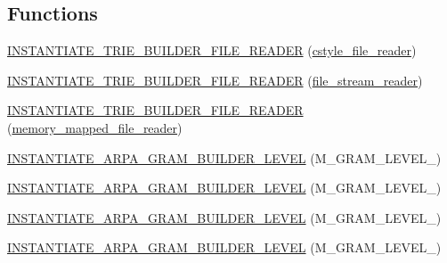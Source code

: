 \subsection*{Functions}
\begin{DoxyCompactItemize}
\item 
\hyperlink{namespaceuva_1_1smt_1_1bpbd_1_1server_1_1lm_1_1arpa_aff53c3e0e4234f71a51aaa7812fd77f3}{I\+N\+S\+T\+A\+N\+T\+I\+A\+T\+E\+\_\+\+T\+R\+I\+E\+\_\+\+B\+U\+I\+L\+D\+E\+R\+\_\+\+F\+I\+L\+E\+\_\+\+R\+E\+A\+D\+E\+R} (\hyperlink{classuva_1_1utils_1_1file_1_1cstyle__file__reader}{cstyle\+\_\+file\+\_\+reader})
\item 
\hyperlink{namespaceuva_1_1smt_1_1bpbd_1_1server_1_1lm_1_1arpa_a29a254dc351f6e454658d54dadb5aff3}{I\+N\+S\+T\+A\+N\+T\+I\+A\+T\+E\+\_\+\+T\+R\+I\+E\+\_\+\+B\+U\+I\+L\+D\+E\+R\+\_\+\+F\+I\+L\+E\+\_\+\+R\+E\+A\+D\+E\+R} (\hyperlink{classuva_1_1utils_1_1file_1_1file__stream__reader}{file\+\_\+stream\+\_\+reader})
\item 
\hyperlink{namespaceuva_1_1smt_1_1bpbd_1_1server_1_1lm_1_1arpa_ad901a2d5ac92c0c80546a45f24ac0baa}{I\+N\+S\+T\+A\+N\+T\+I\+A\+T\+E\+\_\+\+T\+R\+I\+E\+\_\+\+B\+U\+I\+L\+D\+E\+R\+\_\+\+F\+I\+L\+E\+\_\+\+R\+E\+A\+D\+E\+R} (\hyperlink{classuva_1_1utils_1_1file_1_1memory__mapped__file__reader}{memory\+\_\+mapped\+\_\+file\+\_\+reader})
\item 
\hyperlink{namespaceuva_1_1smt_1_1bpbd_1_1server_1_1lm_1_1arpa_aeb9e5217f2df56aebcf96721d5ef9d1e}{I\+N\+S\+T\+A\+N\+T\+I\+A\+T\+E\+\_\+\+A\+R\+P\+A\+\_\+\+G\+R\+A\+M\+\_\+\+B\+U\+I\+L\+D\+E\+R\+\_\+\+L\+E\+V\+E\+L} (M\+\_\+\+G\+R\+A\+M\+\_\+\+L\+E\+V\+E\+L\+\_)
\item 
\hyperlink{namespaceuva_1_1smt_1_1bpbd_1_1server_1_1lm_1_1arpa_afa64b0870997b1747c927e17edb4d8d2}{I\+N\+S\+T\+A\+N\+T\+I\+A\+T\+E\+\_\+\+A\+R\+P\+A\+\_\+\+G\+R\+A\+M\+\_\+\+B\+U\+I\+L\+D\+E\+R\+\_\+\+L\+E\+V\+E\+L} (M\+\_\+\+G\+R\+A\+M\+\_\+\+L\+E\+V\+E\+L\+\_)
\item 
\hyperlink{namespaceuva_1_1smt_1_1bpbd_1_1server_1_1lm_1_1arpa_a46958bd9f84f218dd00b21a23ddbeccf}{I\+N\+S\+T\+A\+N\+T\+I\+A\+T\+E\+\_\+\+A\+R\+P\+A\+\_\+\+G\+R\+A\+M\+\_\+\+B\+U\+I\+L\+D\+E\+R\+\_\+\+L\+E\+V\+E\+L} (M\+\_\+\+G\+R\+A\+M\+\_\+\+L\+E\+V\+E\+L\+\_)
\item 
\hyperlink{namespaceuva_1_1smt_1_1bpbd_1_1server_1_1lm_1_1arpa_a22b1018c33bdaa7517c530a1e10f5166}{I\+N\+S\+T\+A\+N\+T\+I\+A\+T\+E\+\_\+\+A\+R\+P\+A\+\_\+\+G\+R\+A\+M\+\_\+\+B\+U\+I\+L\+D\+E\+R\+\_\+\+L\+E\+V\+E\+L} (M\+\_\+\+G\+R\+A\+M\+\_\+\+L\+E\+V\+E\+L\+\_)
\item 

\end{DoxyCompactItemize}
